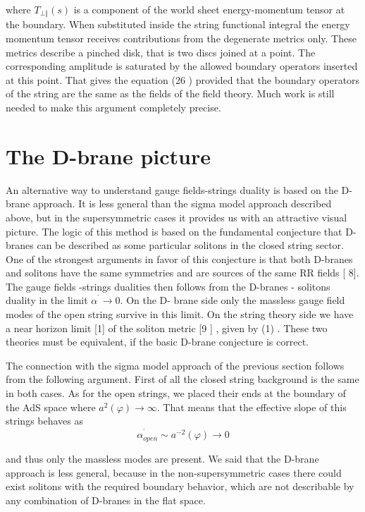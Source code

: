 \documentclass[a4paper,12pt]{article}
\begin{document}
where $T_{\bot \Vert }(s)$ is a component of the world sheet energy-momentum
tensor at the boundary. When substituted inside the string functional
integral the energy momentum tensor receives contributions from the
degenerate metrics only. These metrics describe a pinched disk, that is two
discs joined at a point. The corresponding amplitude is saturated by the
allowed boundary operators inserted at this point. That gives the equation
(26 ) provided that the boundary operators of the string are the same as the
fields of the field theory. Much work is still needed to make this argument
completely precise.

\section{The D-brane picture}

An alternative way to understand gauge fields-strings duality is based on
the D-brane approach. It is less general than the sigma model approach
described above, but in the supersymmetric cases it provides us with an
attractive visual picture. The logic of this method is based on the
fundamental conjecture that D-branes can be described as some particular
solitons in the closed string sector. One of the strongest arguments in
favor of this conjecture is that both D-branes and solitons have the same
symmetries and are sources of the same RR fields [ 8]. The gauge fields
-strings dualities then follows from the D-branes - solitons duality in the
limit $\alpha ^{^{\prime }}\rightarrow 0$. On the D- brane side only the
massless gauge field modes of the open string survive in this limit. On the
string theory side we have a near horizon limit [1] of the soliton metric [9
] , given by (1) . These two theories must be equivalent, if the basic
D-brane conjecture is correct.

The connection with the sigma model approach of the previous section follows
from the following argument. First of all the closed string background is
the same in both cases. As for the open strings, we placed their ends at the
boundary of the AdS space where $a^{2}\left( \varphi \right) \rightarrow
\infty .$ That means that the effective slope of this strings behaves as 
\begin{equation}
\alpha _{open}^{^{\prime }}\sim a^{-2}(\varphi )\rightarrow 0
\end{equation}

and thus only the massless modes are present. We said that the D-brane
approach is less general, because in the non-supersymmetric cases there
could exist solitons with the required boundary behavior, which are not
describable by any combination of D-branes in the flat space.
\end{document}
